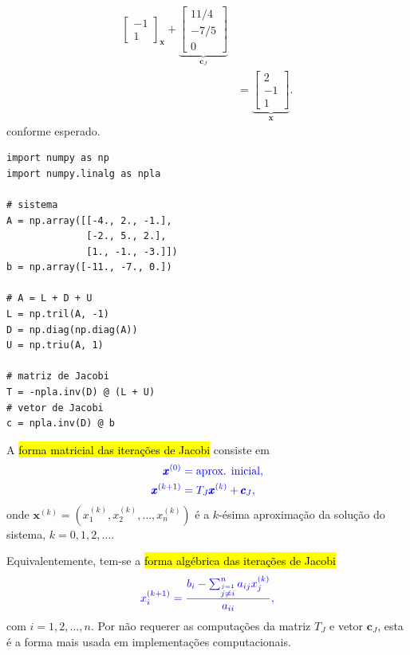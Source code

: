 \begin{ex}
\begin{align}
{\begin{bmatrix}
        -1 \\
        1             
      \end{bmatrix}}_{\pmb{x}} +
      \underbrace{\begin{bmatrix}
       11/4 \\
       -7/5 \\
       0
      \end{bmatrix}}_{\pmb{c}_J}\\
  &= \underbrace{\begin{bmatrix}
        2 \\
        -1 \\
        1             
      \end{bmatrix}}_{\pmb{x}}.
  \end{align}
  conforme esperado.

\begin{lstlisting}
import numpy as np
import numpy.linalg as npla

# sistema
A = np.array([[-4., 2., -1.],
              [-2., 5., 2.],
              [1., -1., -3.]])
b = np.array([-11., -7., 0.])

# A = L + D + U
L = np.tril(A, -1)
D = np.diag(np.diag(A))
U = np.triu(A, 1)

# matriz de Jacobi
T = -npla.inv(D) @ (L + U)
# vetor de Jacobi
c = npla.inv(D) @ b
\end{lstlisting}
\end{ex}

A \hl{forma matricial das iterações de Jacobi} consiste em
\begin{equation}\label{cap_sislin_sec_jgs:eq:iter_jacobi_mat}\color{blue}\begin{aligned}
  \pmb{x}^{(0)} &= \text{aprox. inicial},\\
  \pmb{x}^{(k+1)} &= T_J\pmb{x}^{(k)} + \pmb{c}_J,
\end{aligned}
\end{equation}
onde $\pmb{x}^{(k)} = (x_1^{(k)}, x_2^{(k)}, \dotsc, x_n^{(k)})$ é a $k$-ésima aproximação da solução do sistema, $k=0, 1, 2, \ldots$.

Equivalentemente, tem-se a \hl{forma algébrica das iterações de Jacobi}
\begin{equation}\color{blue}x_i^{(k+1)} = \frac{{b_i - \sum_{\overset{j=1}{j\neq i}}^n a_{ij}x_j^{(k)}}}{a_{ii}},
\end{equation}
com $i = 1, 2, \dotsc, n$. Por não requerer as computações da matriz $T_J$ e vetor $\pmb{c}_J$, esta é a forma mais usada em implementações computacionais.

